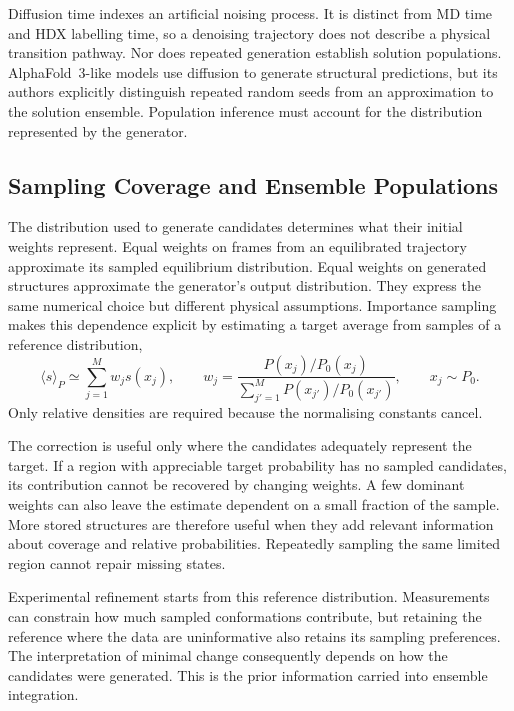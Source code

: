 Diffusion time indexes an artificial noising process. It is distinct from MD time and HDX labelling time, so a denoising trajectory does not describe a physical transition pathway. Nor does repeated generation establish solution populations. AlphaFold~3-like models use diffusion to generate structural predictions, but its authors explicitly distinguish repeated random seeds from an approximation to the solution ensemble.\supercite{abramsonAccurateStructurePrediction2024} Population inference must account for the distribution represented by the generator.

\subsection{Sampling Coverage and Ensemble Populations}
\label{sec:bg-coverage-populations}

The distribution used to generate candidates determines what their initial weights represent. Equal weights on frames from an equilibrated trajectory approximate its sampled equilibrium distribution. Equal weights on generated structures approximate the generator's output distribution. They express the same numerical choice but different physical assumptions. Importance sampling makes this dependence explicit by estimating a target average from samples of a reference distribution,
\begin{equation}
    \langle s\rangle_P\simeq\sum_{j=1}^{M}w_js(x_j),
    \qquad
    w_j=\frac{P(x_j)/P_0(x_j)}
    {\sum_{j'=1}^{M}P(x_{j'})/P_0(x_{j'})},
    \qquad x_j\sim P_0.
    \label{eq:bg-importance-sampling}
\end{equation}
Only relative densities are required because the normalising constants cancel.\supercite{bmsb2012ch2}

The correction is useful only where the candidates adequately represent the target. If a region with appreciable target probability has no sampled candidates, its contribution cannot be recovered by changing weights. A few dominant weights can also leave the estimate dependent on a small fraction of the sample.\supercite{bmsb2012ch2} More stored structures are therefore useful when they add relevant information about coverage and relative probabilities. Repeatedly sampling the same limited region cannot repair missing states.

Experimental refinement starts from this reference distribution. Measurements can constrain how much sampled conformations contribute, but retaining the reference where the data are uninformative also retains its sampling preferences. The interpretation of minimal change consequently depends on how the candidates were generated. This is the prior information carried into ensemble integration.

